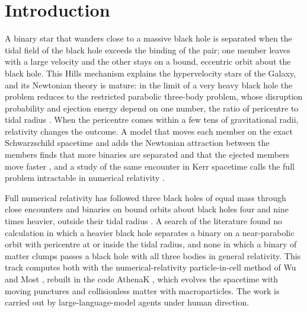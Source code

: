 \documentclass[aps,prd,twocolumn,10pt,superscriptaddress,nofootinbib,longbibliography,floatfix]{revtex4-2}
\begin{document}
\section{Introduction}\label{sec:intro}

A binary star that wanders close to a massive black hole is separated when the tidal field of the black hole exceeds the binding of the pair; one member leaves with a large velocity and the other stays on a bound, eccentric orbit about the black hole. This Hills mechanism explains the hypervelocity stars of the Galaxy, and its Newtonian theory is mature: in the limit of a very heavy black hole the problem reduces to the restricted parabolic three-body problem, whose disruption probability and ejection energy depend on one number, the ratio of pericentre to tidal radius \cite{Sari:2010hills,Kobayashi:2012hills,Brown:2018hills}. When the pericentre comes within a few tens of gravitational radii, relativity changes the outcome. A model that moves each member on the exact Schwarzschild spacetime and adds the Newtonian attraction between the members finds that more binaries are separated and that the ejected members move faster \cite{Manzaneda:2024geodesic}, and a study of the same encounter in Kerr spacetime calls the full problem intractable in numerical relativity \cite{Zhang:2024kerr}.

Full numerical relativity has followed three black holes of equal mass through close encounters \cite{Campanelli:2008three,Lousto:2008multiple,Heinze:2025encounters} and binaries on bound orbits about black holes four and nine times heavier, outside their tidal radius \cite{Ficarra:2024three}. A search of the literature found no calculation in which a heavier black hole separates a binary on a near-parabolic orbit with pericentre at or inside the tidal radius, and none in which a binary of matter clumps passes a black hole with all three bodies in general relativity. This track computes both with the numerical-relativity particle-in-cell method of Wu and Most \cite{Wu:2026nrpic}, rebuilt in the code AthenaK \cite{Stone:2024athenak,Zhu:2024utz}, which evolves the spacetime with moving punctures and collisionless matter with macroparticles. The work is carried out by large-language-model agents under human direction.
\end{document}
